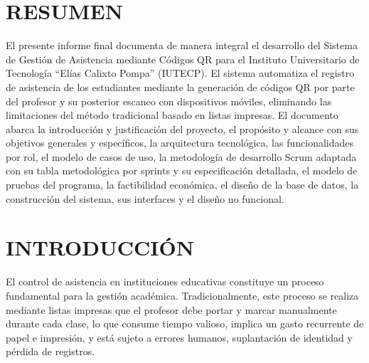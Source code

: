 \documentclass[12pt, letterpaper, oneside]{report}
\begin{document}
\tableofcontents
\newpage

\chapter*{RESUMEN}

El presente informe final documenta de manera integral el desarrollo del Sistema de Gesti\'on de Asistencia mediante C\'odigos QR para el Instituto Universitario de Tecnolog\'ia ``El\'ias Calixto Pompa'' (IUTECP). El sistema automatiza el registro de asistencia de los estudiantes mediante la generaci\'on de c\'odigos QR por parte del profesor y su posterior escaneo con dispositivos m\'oviles, eliminando las limitaciones del m\'etodo tradicional basado en listas impresas. El documento abarca la introducci\'on y justificaci\'on del proyecto, el prop\'osito y alcance con sus objetivos generales y espec\'ificos, la arquitectura tecnol\'ogica, las funcionalidades por rol, el modelo de casos de uso, la metodolog\'ia de desarrollo Scrum adaptada con su tabla metodol\'ogica por sprints y su especificaci\'on detallada, el modelo de pruebas del programa, la factibilidad econ\'omica, el dise\~no de la base de datos, la construcci\'on del sistema, sus interfaces y el dise\~no no funcional.

\newpage

\pagestyle{body}

\chapter{INTRODUCCI\'ON}

El control de asistencia en instituciones educativas constituye un proceso fundamental para la gesti\'on acad\'emica. Tradicionalmente, este proceso se realiza mediante listas impresas que el profesor debe portar y marcar manualmente durante cada clase, lo que consume tiempo valioso, implica un gasto recurrente de papel e impresi\'on, y est\'a sujeto a errores humanos, suplantaci\'on de identidad y p\'erdida de registros.
\end{document}
